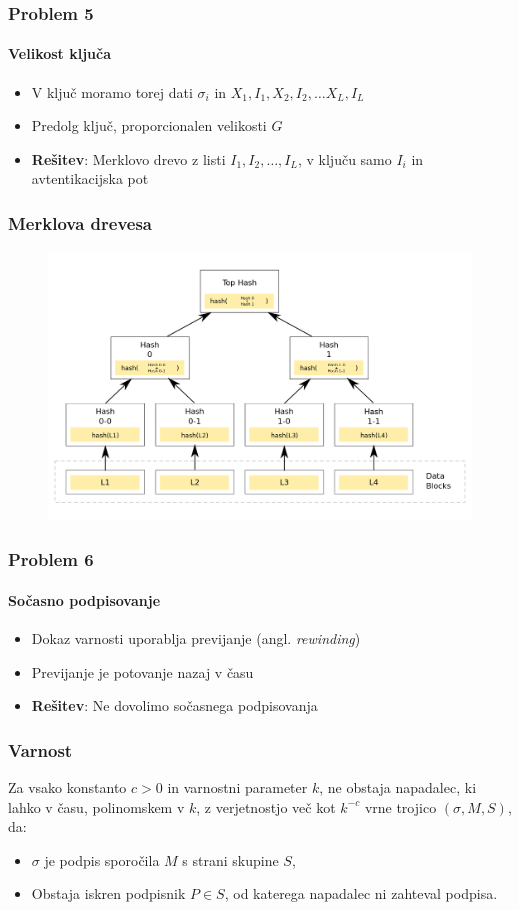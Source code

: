\documentclass{beamer}    %
\begin{document}
\begin{frame}
    \frametitle{Problem 5}
    \framesubtitle{Velikost ključa}
    \begin{itemize}
        \item V ključ moramo torej dati $\sigma_i$ in $X_1, I_1, X_2, I_2, 
        \dots X_L, I_L$
        \item Predolg ključ, proporcionalen velikosti $G$
        \vspace{1cm}
        \item \textbf{Rešitev}: Merklovo drevo z listi $I_1, I_2, \dots, I_L$, 
            v ključu samo $I_i$ in avtentikacijska pot  
    \end{itemize}  
\end{frame}

\begin{frame}
    \frametitle{Merklova drevesa}
    \begin{figure}
        \includegraphics[width=\textwidth]{images/merkle-tree.png}
    \end{figure}
\end{frame}

\begin{frame}
    \frametitle{Problem 6}
    \framesubtitle{Sočasno podpisovanje}
    \begin{itemize}
        \item Dokaz varnosti uporablja previjanje (angl. \textit{rewinding})
        \item Previjanje je potovanje nazaj v času
        \vspace{1cm}
        \item \textbf{Rešitev}: Ne dovolimo sočasnega podpisovanja
    \end{itemize}
\end{frame}

\begin{frame}
    \frametitle{Varnost}
    Za vsako konstanto $c > 0$ in varnostni parameter $k$, ne obstaja
    napadalec, ki lahko v času, polinomskem v $k$, z verjetnostjo več 
    kot $k^{-c}$ vrne trojico $(\sigma, M, S)$, da:
    \begin{itemize}
        \item $\sigma$ je podpis sporočila $M$ s strani skupine $S$,
        \item Obstaja iskren podpisnik $P \in S$, od katerega napadalec 
            ni zahteval podpisa.
    \end{itemize}
\end{frame}
\end{document}
